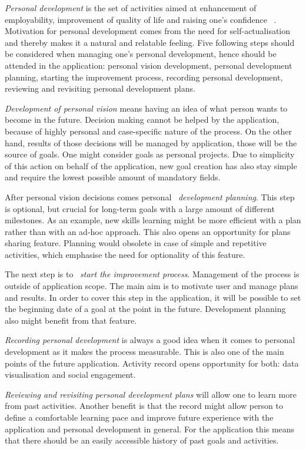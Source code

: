 \textit{Personal development} is the set of activities aimed at enhancement of employability, improvement of quality of life and raising one's confidence ~\cite{what-is-personal-development}.
Motivation for personal development comes from the need for self-actualisation and thereby makes it a natural and relatable feeling.
Five following steps should be considered when managing one's personal development, hence should be attended in the application:
personal vision development, personal development planning, starting the improvement process, recording personal development, reviewing and revisiting personal development plans.

\textit{Development of personal vision} means having an idea of what person wants to become in the future.
Decision making cannot be helped by the application, because of highly personal and case-specific nature of the process.
On the other hand, results of those decisions will be managed by application, those will be the source of goals.
One might consider goals as personal projects.
Due to simplicity of this action on behalf of the application, new goal creation has also stay simple and require the lowest possible amount of mandatory fields.

After personal vision decisions comes personal ~\textit{development planning}.
This step is optional, but crucial for long-term goals with a large amount of different milestones.
As an example, new skills learning might be more efficient with a plan rather than with an ad-hoc approach.
This also opens an opportunity for plans sharing feature.
Planning would obsolete in case of simple and repetitive activities, which emphasise the need for optionality of this feature.

The next step is to ~\textit{start the improvement process}.
Management of the process is outside of application scope.
The main aim is to motivate user and manage plans and results.
In order to cover this step in the application, it will be possible to set the beginning date of a goal at the point in the future.
Development planning also might benefit from that feature.

\textit{Recording personal development} is always a good idea when it comes to personal development as it makes the process measurable.
This is also one of the main points of the future application.
Activity record opens opportunity for both: data visualisation and social engagement.

\textit{Reviewing and revisiting personal development plans} will allow one to learn more from past activities.
Another benefit is that the record might allow person to define a comfortable learning pace and improve future experience with the application and personal development in general.
For the application this means that there should be an easily accessible history of past goals and activities.

